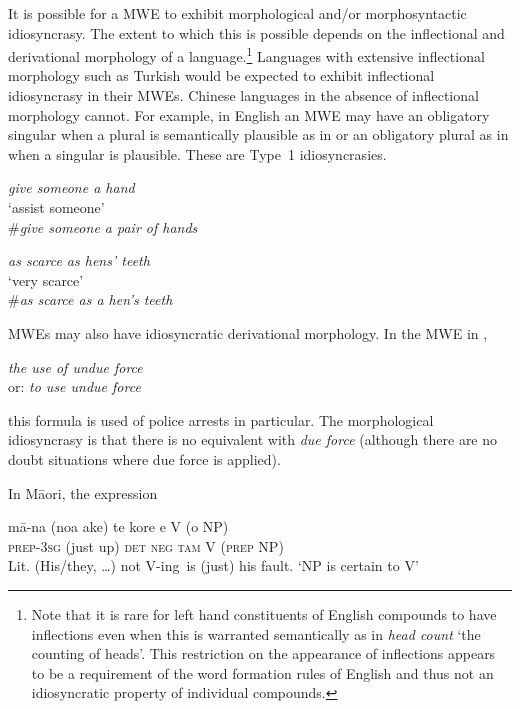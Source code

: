 \documentclass[output=paper]{langsci/langscibook}
\begin{document}
It is possible for a MWE to exhibit morphological and/or morphosyntactic idiosyncrasy. The extent to which this is possible depends on the inflectional and derivational morphology of a language.\footnote{Note that it is rare for left hand constituents of  English compounds to have inflections even when this is warranted semantically as in \textit{head count} ‘the counting of heads’. This restriction on the appearance of inflections appears to be a requirement of the word formation rules of English and thus not an idiosyncratic property of individual compounds.}  
Languages with extensive inflectional morphology such as Turkish  would be expected to exhibit inflectional idiosyncrasy in their MWEs. 
 Chinese languages in the absence of inflectional morphology cannot. For example, in English an MWE may have an obligatory singular when a plural is semantically plausible as in  or an obligatory plural as in  when a singular is plausible. These are Type~1 idiosyncrasies.

\begin{exe}
\ex\label{ex:ex13}   \textit{give someone a hand}\\
‘assist someone’\\
\#\textit{give someone a pair of hands}

\ex\label{ex:ex14}  \textit{as scarce as hens’ teeth}\\
  ‘very scarce’\\
  \#\textit{as scarce as a hen’s teeth}
\end{exe}

MWEs may also have  idiosyncratic derivational morphology. In the MWE in ,

\begin{exe}
\ex\label{ex:ex15}   \textit{the use of undue force}\\ 
or: \textit{to use undue force}
\end{exe}

\noindent
this formula is used of police arrests in particular. The morphological idiosyncrasy is that there is no equivalent with \textit{due force} (although there are no doubt situations where due force is applied). 

In M\=aori, the expression 


\ea\label{ex:ex16}
\gll m\=a-na    (noa ake) te     kore e        V (o NP)\\
     \textsc{prep}-\textsc{3sg} (just up)  \textsc{det} \textsc{neg} \textsc{tam} V (\textsc{prep} NP)\\
\glt Lit. (His/they, \ldots) not V-ing~is (just) his fault.
\glt ‘NP is certain to V’
\z
\end{document}
